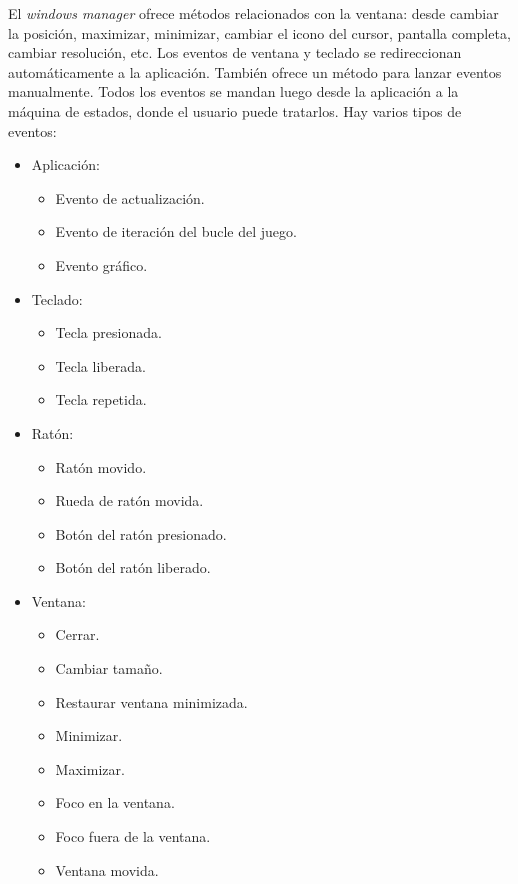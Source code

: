 El \textit{windows manager} ofrece métodos relacionados con la ventana: desde cambiar la posición, maximizar, minimizar,
cambiar el icono del cursor, pantalla completa, cambiar resolución, etc. Los eventos de ventana y teclado
se redireccionan automáticamente a la aplicación. También ofrece un método para lanzar eventos manualmente.
\newpage
Todos los eventos se mandan luego desde la aplicación a la máquina de estados, donde el usuario puede
tratarlos. Hay varios tipos de eventos:
\begin{itemize}
    \item Aplicación:
    \begin{itemize}
        \item Evento de actualización.
        \item Evento de iteración del bucle del juego.
        \item Evento gráfico.
    \end{itemize}
    \item Teclado:
    \begin{itemize}
        \item Tecla presionada.
        \item Tecla liberada.
        \item Tecla repetida.
    \end{itemize}
    \item Ratón:
    \begin{itemize}
        \item Ratón movido.
        \item Rueda de ratón movida.
        \item Botón del ratón presionado.
        \item Botón del ratón liberado.
    \end{itemize}
    \item Ventana:
    \begin{itemize}
        \item Cerrar.
        \item Cambiar tamaño.
        \item Restaurar ventana minimizada.
        \item Minimizar.
        \item Maximizar.
        \item Foco en la ventana.
        \item Foco fuera de la ventana.
        \item Ventana movida.
    \end{itemize}
\end{itemize}


